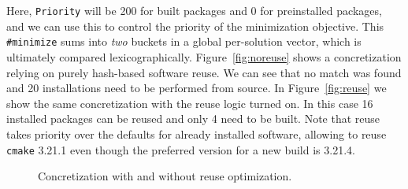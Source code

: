Here, {\tt Priority} will be 200 for built packages and 0 for preinstalled packages, and
we can use this to control the priority of the minimization objective. This {\tt
  \#minimize} sums into {\it two} buckets in a global per-solution vector, which is
ultimately compared lexicographically.
%
%
Figure~\ref{fig:noreuse} shows a concretization relying on purely hash-based software
reuse. We can see that no match was found and 20 installations need to be performed from
source. In Figure~\ref{fig:reuse} we show the same concretization with the reuse logic
turned on. In this case 16 installed packages can be reused and only 4 need to be built.
Note that reuse takes priority over the defaults for already installed software,
allowing \spack{} to reuse \texttt{cmake} 3.21.1 even though the preferred version for a
new build is 3.21.4.

\begin{figure}[h]
  \centering
  \caption{Concretization with and without reuse optimization. \vspace{-1em}}

\end{figure}


